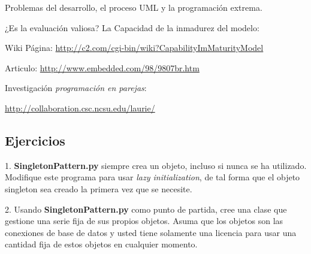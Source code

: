 Problemas del desarrollo, el proceso UML y la programación extrema.\newline 
  
¿Es la evaluación valiosa?  La Capacidad de la inmadurez del modelo: \newline

Wiki Página: \textcolor[rgb]{0.2,0.5,0.7}{\underline{http://c2.com/cgi-bin/wiki?CapabilityImMaturityModel}} \newline 

Articulo: \textcolor[rgb]{0.2,0.5,0.7}{\underline{http://www.embedded.com/98/9807br.htm}} \newline  

Investigación \textit{programación en parejas}:   \newline

\textcolor[rgb]{0.2,0.5,0.7}{\underline{http://collaboration.csc.ncsu.edu/laurie/}} \newline 

\subsection*{Ejercicios}
\label{subsec:exercise}

1. \textbf{SingletonPattern.py} siempre crea un objeto,  incluso si nunca se ha utilizado. Modifique este programa para usar \textit{lazy initialization}, de tal forma que el objeto singleton sea creado la primera vez que se necesite.    \newline

2. Usando \textbf{SingletonPattern.py} como punto de partida, cree una clase que gestione una serie fija de sus propios objetos. Asuma que los objetos son las conexiones de base de datos y usted tiene solamente una licencia para usar una cantidad fija de estos objetos en cualquier momento.    \newline